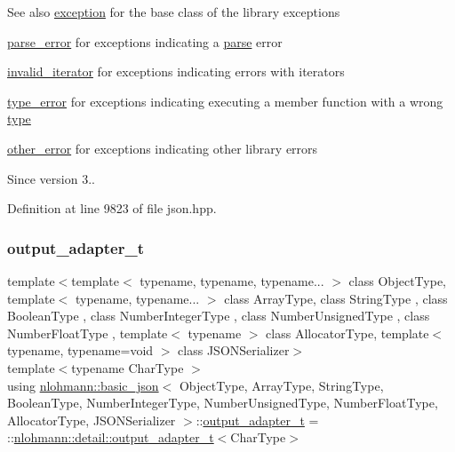 \begin{DoxySeeAlso}{See also}
\hyperlink{classnlohmann_1_1basic__json_a9a0aced019cb1d65bb49703406c84970}{exception} for the base class of the library exceptions 

\hyperlink{classnlohmann_1_1basic__json_af1efc2468e6022be6e35fc2944cabe4d}{parse\+\_\+error} for exceptions indicating a \hyperlink{classnlohmann_1_1basic__json_aa9676414f2e36383c4b181fe856aa3c0}{parse} error 

\hyperlink{classnlohmann_1_1basic__json_ac13d32f7cbd02d616e71d8dc30dadcbf}{invalid\+\_\+iterator} for exceptions indicating errors with iterators 

\hyperlink{classnlohmann_1_1basic__json_a4010e8e268fefd86da773c10318f2902}{type\+\_\+error} for exceptions indicating executing a member function with a wrong \hyperlink{classnlohmann_1_1basic__json_a2b2d781d7f2a4ee41bc0016e931cadf7}{type} 

\hyperlink{classnlohmann_1_1basic__json_a3333a5a8714912adda33a35b369f7b3d}{other\+\_\+error} for exceptions indicating other library errors
\end{DoxySeeAlso}
\begin{DoxySince}{Since}
version 3.. 
\end{DoxySince}


Definition at line 9823 of file json.\+hpp.

\mbox{\label{classnlohmann_1_1basic__json_a5f17a041e3338ea006eaac2d89446c0d}} 
\subsubsection{\texorpdfstring{output\+\_\+adapter\+\_\+t}{output\_adapter\_t}}
{\footnotesize\ttfamily template$<$template$<$ typename, typename, typename... $>$ class Object\+Type, template$<$ typename, typename... $>$ class Array\+Type, class String\+Type , class Boolean\+Type , class Number\+Integer\+Type , class Number\+Unsigned\+Type , class Number\+Float\+Type , template$<$ typename $>$ class Allocator\+Type, template$<$ typename, typename=void $>$ class J\+S\+O\+N\+Serializer$>$ \\
template$<$typename Char\+Type $>$ \\
using \hyperlink{classnlohmann_1_1basic__json}{nlohmann\+::basic\+\_\+json}$<$ Object\+Type, Array\+Type, String\+Type, Boolean\+Type, Number\+Integer\+Type, Number\+Unsigned\+Type, Number\+Float\+Type, Allocator\+Type, J\+S\+O\+N\+Serializer $>$\+::\hyperlink{classnlohmann_1_1basic__json_a5f17a041e3338ea006eaac2d89446c0d}{output\+\_\+adapter\+\_\+t} =  \+::\hyperlink{namespacenlohmann_1_1detail_a9b680ddfb58f27eb53a67229447fc556}{nlohmann\+::detail\+::output\+\_\+adapter\+\_\+t}$<$Char\+Type$>$\hspace{0.3cm}{\ttfamily [private]}}



